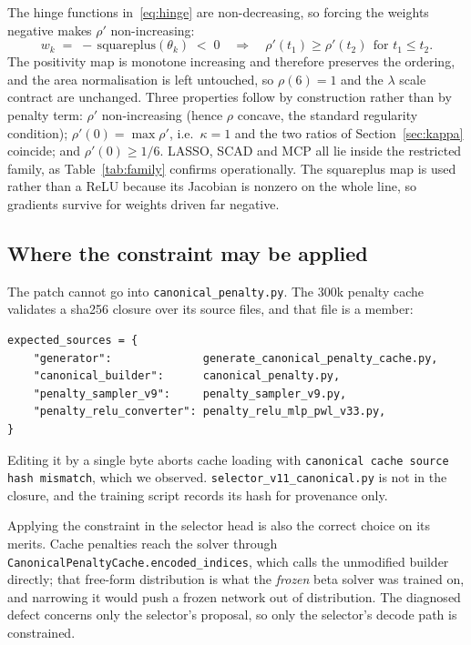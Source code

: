 \documentclass[11pt]{article}
\begin{document}
The hinge functions in~\eqref{eq:hinge} are non-decreasing, so forcing the
weights negative makes $\rho'$ non-increasing:
%
\begin{equation}
w_k \;=\; -\,\mathrm{squareplus}(\theta_k) \;<\; 0
\quad\Longrightarrow\quad
\rho'(t_1) \ge \rho'(t_2) \ \ \text{for } t_1 \le t_2 .
\label{eq:monotone}
\end{equation}
%
The positivity map is monotone increasing and therefore preserves the
ordering, and the area normalisation is left untouched, so $\rho(6) = 1$ and
the $\lambda$ scale contract are unchanged. Three properties follow by
construction rather than by penalty term:
$\rho'$ non-increasing (hence $\rho$ concave, the standard regularity
condition); $\rho'(0) = \max\rho'$, i.e.\ $\kappa = 1$ and the two ratios of
Section~\ref{sec:kappa} coincide; and $\rho'(0) \ge 1/6$. LASSO, SCAD and MCP
all lie inside the restricted family, as Table~\ref{tab:family} confirms
operationally. The squareplus map is used rather than a ReLU because its
Jacobian is nonzero on the whole line, so gradients survive for weights driven
far negative.

\subsection{Where the constraint may be applied}

The patch cannot go into \texttt{canonical\_penalty.py}. The $300$k penalty
cache validates a sha256 closure over its source files, and that file is a
member:

\begin{verbatim}
expected_sources = {
    "generator":              generate_canonical_penalty_cache.py,
    "canonical_builder":      canonical_penalty.py,
    "penalty_sampler_v9":     penalty_sampler_v9.py,
    "penalty_relu_converter": penalty_relu_mlp_pwl_v33.py,
}
\end{verbatim}

Editing it by a single byte aborts cache loading with
\texttt{canonical cache source hash mismatch}, which we observed.
\texttt{selector\_v11\_canonical.py} is not in the closure, and the training
script records its hash for provenance only.

Applying the constraint in the selector head is also the correct choice on its
merits. Cache penalties reach the solver through
\texttt{CanonicalPenaltyCache.encoded\_indices}, which calls the unmodified
builder directly; that free-form distribution is what the \emph{frozen} beta
solver was trained on, and narrowing it would push a frozen network
out of distribution. The diagnosed defect concerns only the selector's
proposal, so only the selector's decode path is constrained.
\end{document}
